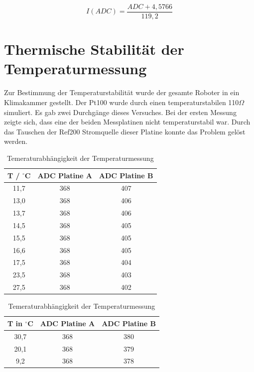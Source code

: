 \documentclass[a4paper,bibtotoc,oneside]{scrbook}
\begin{document}
\begin{equation}
     I(ADC) = \frac{ADC + 4,5766} {119,2} 
\end{equation}
  


\section{Thermische Stabilität der Temperaturmessung}\thispagestyle{empty}
Zur Bestimmung der Temperaturstabilität wurde der gesamte Roboter in ein Klimakammer gestellt. Der Pt100 wurde durch einen temperaturstabilen 110$\Omega$ simuliert.
Es gab zwei Durchgänge dieses Versuches.
Bei der ersten Messung zeigte sich, dass eine der beiden Messplatinen nicht temperaturstabil war. Durch das Tauschen der Ref200 Stromquelle dieser Platine konnte das Problem gelöst werden.

\begin{table}[htbp]
\centering
\begin{tabular}{ | c | c | c |}\hline
{\bf T / $^{\circ}$C} & {\bf ADC Platine A} & {\bf ADC Platine B}\\ \hline
\hline
11,7 & 368 & 407\\ \hline
13,0 & 368 & 406\\ \hline
13,7 & 368 & 406\\ \hline
14,5 & 368 & 405\\ \hline
15,5 & 368 & 405\\ \hline
16,6 & 368 & 405\\ \hline
17,5 & 368 & 404\\ \hline
23,5 & 368 & 403\\ \hline
27,5 & 368 & 402\\ \hline
\end{tabular}
\caption{Temeraturabhängigkeit der Temperaturmessung}\label{TabT1}
\end{table}

\begin{table}[htbp]
\centering
\begin{tabular}{ | c | c | c |}\hline
{\bf T in $^{\circ}$C} & {\bf ADC Platine A} & {\bf ADC Platine B}\\ \hline
\hline
30,7 & 368 & 380\\ \hline
20,1 & 368 & 379\\ \hline
9,2 & 368 & 378\\ \hline
\end{tabular}
\caption{Temeraturabhängigkeit der Temperaturmessung}\label{TabT2}
\end{table}
\end{document}
